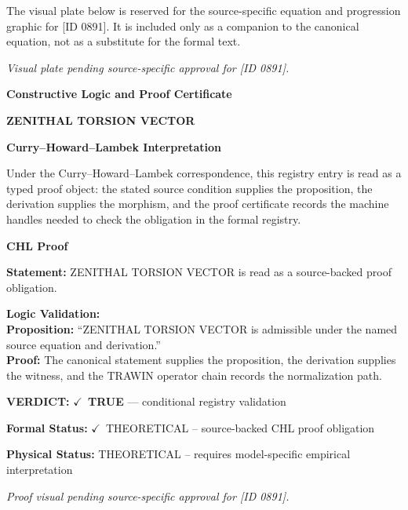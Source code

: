 \begingroup\footnotesize\sloppy
The visual plate below is reserved for the source-specific equation and progression graphic for [ID 0891]. It is included only as a companion to the canonical equation, not as a substitute for the formal text.
\par\endgroup
\begingroup\footnotesize\itshape
Visual plate pending source-specific approval for [ID 0891].
\par\endgroup

\clearpage
\begingroup\tzpsupportsetup
\noindent\textbf{\fontsize{10.8pt}{12.8pt}\selectfont [ID 0891] Constructive Logic and Proof Certificate}\par
\noindent\textbf{\fontsize{10pt}{12pt}\selectfont ZENITHAL TORSION VECTOR}\par
\vspace{0.45em}
\begingroup
\footnotesize
\setlength{\parskip}{0.22em}
\setlength{\parindent}{0pt}
\noindent\textbf{Curry--Howard--Lambek Interpretation}\par
Under the Curry--Howard--Lambek correspondence, this registry entry is read as a typed proof
object: the stated source condition supplies the proposition, the derivation supplies the
morphism, and the proof certificate records the machine handles needed to check the obligation
in the formal registry.

\vspace{0.45em}
\noindent\textbf{CHL Proof}\par
\textbf{Statement:} ZENITHAL TORSION VECTOR is read as a source-backed proof obligation.

\textbf{Logic Validation:}\\
\textbf{Proposition:} ``ZENITHAL TORSION VECTOR is admissible under the named source equation and derivation.''\\
\textbf{Proof:} The canonical statement supplies the proposition, the derivation supplies the witness, and the TRAWIN operator chain records the normalization path.

\textbf{VERDICT:} \ensuremath{\checkmark}\ \textbf{TRUE} --- conditional registry validation

\textbf{Formal Status:} \ensuremath{\checkmark}\ THEORETICAL -- source-backed CHL proof obligation

\textbf{Physical Status:} THEORETICAL -- requires model-specific empirical interpretation
\par\vspace{0.45em}
\par
\vfill
\begingroup\footnotesize\itshape
Proof visual pending source-specific approval for [ID 0891].
\par\endgroup
\vfill
\endgroup
\endgroup
